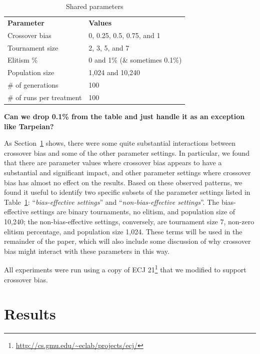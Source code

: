 \documentclass{sig-alternate}
\begin{document}
\begin{table}[tb]
\begin{center}
\begin{tabular}{ll}
\textbf{Parameter} & \textbf{Values} \\
Crossover bias & 0, 0.25, 0.5, 0.75, and 1 \\
Tournament size & 2, 3, 5, and 7 \\
Elitism \% & 0 and 1\% (\& sometimes 0.1\%) \\
Population size & 1,024 and 10,240 \\
\# of generations & 100 \\
\# of runs per treatment & 100
\end{tabular}
\end{center}
\vspace{-0.5cm}
\caption{Shared parameters}
\label{tab:sharedParameters}
\end{table}

\textbf{Can we drop 0.1\% from the table and just handle it as an exception like Tarpeian?}

As Section~\ref{sec:Results} shows, there were some quite substantial interactions between 
crossover bias and some of the other parameter settings. In particular, we found that there are 
parameter values where crossover bias appears to have a substantial and significant impact, 
and other parameter settings
where crossover bias has almost no effect on the results. 
Based on these observed patterns, 
we found it useful to identify two specific subsets of the parameter settings listed in 
Table~\ref{tab:sharedParameters}: ``\emph{bias-effective settings}'' and 
``\emph{non-bias-effective settings}''.
The bias-effective settings are binary tournaments, no elitism, and population size of 10,240; 
the non-bias-effective settings, conversely, are tournament size 7, non-zero elitism percentage, 
and population size 1,024. These terms will be used in the remainder of the paper, which will 
also include some discussion of why crossover bias might interact with these parameters in this way.

All experiments were run using a copy of ECJ 21\footnote{\url{http://cs.gmu.edu/~eclab/projects/ecj/}} 
that we modified to support crossover bias.

\section{Results} \label{sec:Results}
\end{document}
